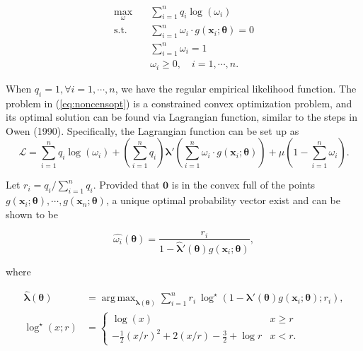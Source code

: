 \documentclass[article]{jss}
\renewcommand{\|}{\,|\,}
\begin{document}
\begin{equation} \label{eq:noncensopt}
\begin{split}
  \max_{\omega}\quad & \sum_{i=1}^n q_i \log(\omega_i) \\
  \text{s.t.}\quad & \sum_{i=1}^n \omega_i\cdot g(\bm x_i;\bm \theta) = 0 \\
  & \sum_{i=1}^n \omega_i = 1 \\
  & \omega_i \geq 0, \quad i=1,\cdots,n.
\end{split}
\end{equation}

When \(q_i = 1, \forall i=1,\cdots,n\), we have the regular empirical likelihood function. The problem in (\ref{eq:noncensopt}) is a constrained convex optimization problem, and its optimal solution can be found via Lagrangian function, similar to the steps in Owen (1990). Specifically, the Lagrangian function can be set up as
\begin{equation} \label{eq:lagrange}
  \mathcal{L}= \sum_{i=1}^n q_i\log(\omega_i) + (\sum_{i=1}^n q_i)\bm \lambda'(\sum_{i=1}^n \omega_i \cdot g(\bm x_i;\bm \theta)) + \mu(1-\sum_{i=1}^n \omega_i).
\end{equation}

Let \(r_i = q_i/\sum_{i=1}^n q_i\). Provided that \(\bm 0\) is in the convex full of the points \(g(\bm x_i;\bm \theta),\cdots,g(\bm x_n;\bm \theta)\), a unique optimal probability vector exist and can be shown to be

\begin{equation}\label{eq:omegahat}
  \hat{\omega_i}(\bm \theta) = \frac{r_i}{1 - \hat{\bm \lambda}'(\bm \theta) g(\bm x_i;\bm \theta)},
\end{equation}

where

\begin{equation}
\begin{aligned}
\hat{\bm \lambda}(\bm \theta) &= \mathop{\mathrm{arg\,max}}_{\bm \lambda(\bm \theta)} \sum_{i=1}^n r_i\ {\log}^{\star}\left(1 - \bm \lambda'(\bm \theta) g(\bm x_i;\bm \theta); r_i\right), \\
{\log}^{\star}(x; r) &= 
\begin{cases} 
\log(x) & x \ge r \\
- \frac{1}{2} (x/r)^2 + 2 (x/r) - \frac{3}{2} + \log r & x < r.
\end{cases}
\end{aligned}
\label{eq:optim}
\end{equation}
\end{document}
